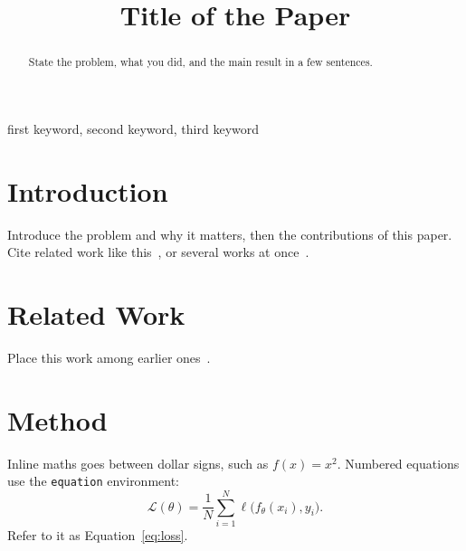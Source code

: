 \documentclass[conference]{IEEEtran}
\begin{document}
\title{Title of the Paper}

\author{
\and
{}
}

\maketitle

\begin{abstract}
State the problem, what you did, and the main result in a few sentences.
\end{abstract}

\begin{IEEEkeywords}
first keyword, second keyword, third keyword
\end{IEEEkeywords}

\section{Introduction}
\label{sec:intro}
Introduce the problem and why it matters, then the contributions of this
paper. Cite related work like this~\cite{he2016deep}, or several works at
once~\cite{vaswani2017attention,he2016deep}.

\section{Related Work}
Place this work among earlier ones~\cite{knuth1984,lamport1994}.

\section{Method}
\label{sec:method}
Inline maths goes between dollar signs, such as $f(x) = x^2$. Numbered
equations use the \texttt{equation} environment:
\begin{equation}
  \label{eq:loss}
  \mathcal{L}(\theta) = \frac{1}{N} \sum_{i=1}^{N} \ell\bigl(f_\theta(x_i), y_i\bigr).
\end{equation}
Refer to it as Equation~\eqref{eq:loss}.
\end{document}
